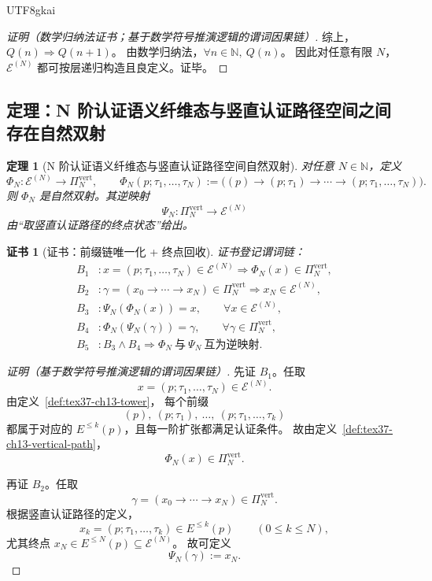 \documentclass[12pt]{article}
\newtheorem{theorem}{定理}[section]
\newtheorem{Certificate}{证书}[section]
\newcommand{\NN}{\mathbb{N}}
\begin{document}
\begin{CJK*}{UTF8}{gkai}
\begin{proof}[证明（数学归纳法证书；基于数学符号推演逻辑的谓词因果链）]
综上，$Q(n)\Rightarrow Q(n+1)$。
由数学归纳法，$\forall n\in\NN,\ Q(n)$。
因此对任意有限 $N$，$\mathcal E^{(N)}$ 都可按层递归构造且良定义。证毕。
\end{proof}

\subsection{定理：N 阶认证语义纤维态与竖直认证路径空间之间存在自然双射}
\label{subsec:tex37-ch13-bijection}

\begin{theorem}[N 阶认证语义纤维态与竖直认证路径空间自然双射]
\label{thm:tex37-ch13-bijection}
对任意 $N\in\NN$，定义
\[
  \Phi_N:\mathcal E^{(N)}\to \Pi_N^{\mathrm{vert}},
  \qquad
  \Phi_N(p;\tau_1,\dots,\tau_N)
  :=
  \bigl(
    (p)\to
    (p;\tau_1)\to\cdots\to
    (p;\tau_1,\dots,\tau_N)
  \bigr).
\]
则 $\Phi_N$ 是自然双射。其逆映射
\[
  \Psi_N:\Pi_N^{\mathrm{vert}}\to \mathcal E^{(N)}
\]
由“取竖直认证路径的终点状态”给出。
\end{theorem}

\begin{Certificate}[证书：前缀链唯一化 + 终点回收]
\label{cert:tex37-ch13-bijection}
证书登记谓词链：
\[
\begin{aligned}
  B_1 &: x=(p;\tau_1,\dots,\tau_N)\in\mathcal E^{(N)}
  \Rightarrow
  \Phi_N(x)\in \Pi_N^{\mathrm{vert}},\\
  B_2 &: \gamma=(x_0\to\cdots\to x_N)\in\Pi_N^{\mathrm{vert}}
  \Rightarrow
  x_N\in \mathcal E^{(N)},\\
  B_3 &: \Psi_N(\Phi_N(x))=x,\qquad \forall x\in\mathcal E^{(N)},\\
  B_4 &: \Phi_N(\Psi_N(\gamma))=\gamma,\qquad \forall \gamma\in \Pi_N^{\mathrm{vert}},\\
  B_5 &: B_3\wedge B_4 \Rightarrow \Phi_N\ \text{与}\ \Psi_N\ \text{互为逆映射}.
\end{aligned}
\]
\end{Certificate}

\begin{proof}[证明（基于数学符号推演逻辑的谓词因果链）]
先证 $B_1$。任取
\[
  x=(p;\tau_1,\dots,\tau_N)\in \mathcal E^{(N)}.
\]
由定义~\ref{def:tex37-ch13-tower}，
每个前缀
\[
  (p),\ (p;\tau_1),\ \dots,\ (p;\tau_1,\dots,\tau_k)
\]
都属于对应的 $E^{\le k}(p)$，且每一阶扩张都满足认证条件。
故由定义~\ref{def:tex37-ch13-vertical-path}，
\[
  \Phi_N(x)\in \Pi_N^{\mathrm{vert}}.
\]

再证 $B_2$。任取
\[
  \gamma=(x_0\to\cdots\to x_N)\in \Pi_N^{\mathrm{vert}}.
\]
根据竖直认证路径的定义，
\[
  x_k=(p;\tau_1,\dots,\tau_k)\in E^{\le k}(p)\qquad (0\le k\le N),
\]
尤其终点 $x_N\in E^{\le N}(p)\subseteq \mathcal E^{(N)}$。
故可定义
\[
  \Psi_N(\gamma):=x_N.
\]


\end{proof}
\end{CJK*}
\end{document}
